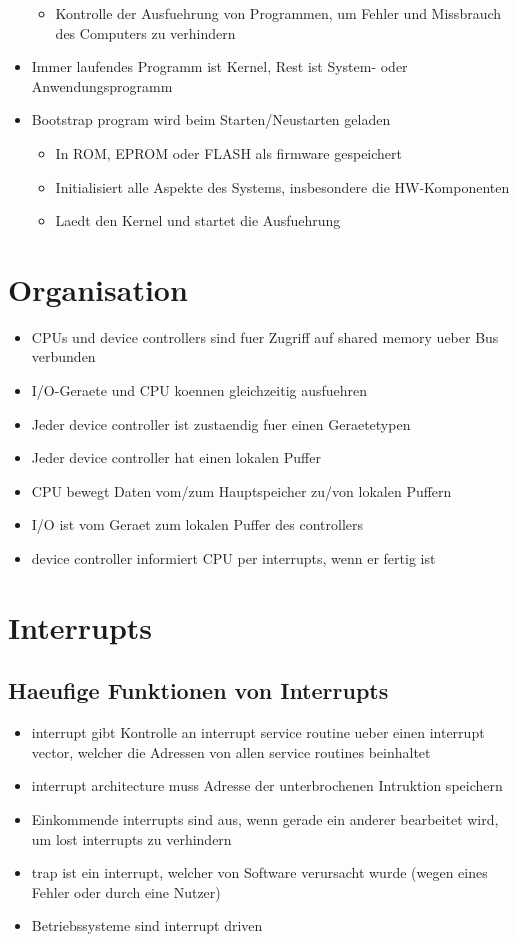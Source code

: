 \documentclass[a4paper]{scrreprt}
\begin{document}
\begin{itemize}
		\begin{itemize}
			\item Kontrolle der Ausfuehrung von Programmen, um Fehler und Missbrauch des Computers zu verhindern
		\end{itemize}
	\item Immer laufendes Programm ist Kernel, Rest ist System- oder Anwendungsprogramm
	\item Bootstrap program wird beim Starten/Neustarten geladen
		\begin{itemize}
			\item In ROM, EPROM oder FLASH als firmware gespeichert
			\item Initialisiert alle Aspekte des Systems, insbesondere die HW-Komponenten
			\item Laedt den Kernel und startet die Ausfuehrung
		\end{itemize}
\end{itemize}

\section{Organisation}
\begin{itemize}
	\item CPUs und device controllers sind fuer Zugriff auf shared memory ueber Bus verbunden
	\item I/O-Geraete und CPU koennen gleichzeitig ausfuehren
	\item Jeder device controller ist zustaendig fuer einen Geraetetypen
	\item Jeder device controller hat einen lokalen Puffer
	\item CPU bewegt Daten vom/zum Hauptspeicher zu/von lokalen Puffern
	\item I/O ist vom Geraet zum lokalen Puffer des controllers
	\item device controller informiert CPU per interrupts, wenn er fertig ist
\end{itemize}


\section{Interrupts}
\subsection{Haeufige Funktionen von Interrupts}
\begin{itemize}
	\item interrupt gibt Kontrolle an interrupt service routine ueber einen interrupt vector, welcher die Adressen von allen service routines beinhaltet
	\item interrupt architecture muss Adresse der unterbrochenen Intruktion speichern
	\item Einkommende interrupts sind aus, wenn gerade ein anderer bearbeitet wird, um lost interrupts zu verhindern
	\item trap ist ein interrupt, welcher von Software verursacht wurde (wegen eines Fehler oder durch eine Nutzer)
	\item Betriebssysteme sind interrupt driven
\end{itemize}
\end{document}
